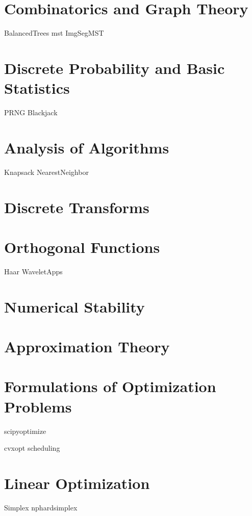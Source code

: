 \documentclass[nociteref]{newsiambook}
\begin{document}
\part{Combinatorics and Graph Theory}
{BalancedTrees}
{mst}
{ImgSegMST}

\part{Discrete Probability and Basic Statistics}
{PRNG}
{Blackjack}

\part{Analysis of Algorithms}
{Knapsack}
{NearestNeighbor}

\part{Discrete Transforms}

\part{Orthogonal Functions}
{Haar}
{WaveletApps}

\part{Numerical Stability}

\part{Approximation Theory}

\part{Formulations of Optimization Problems}
{scipyoptimize}

{cvxopt}
{scheduling}

\part{Linear Optimization}
{Simplex}
{nphardsimplex}
\end{document}
